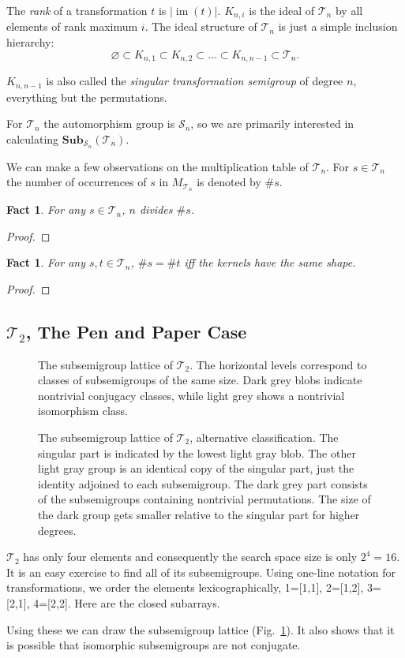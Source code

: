 \documentclass{amsart}
\newcommand{\cT}{{\mathcal T}}
\newcommand{\cS}{{\mathcal S}}
\newcommand{\Sub}{\mathbf{Sub}}
\DeclareMathOperator{\im}{im}
\theoremstyle{plain}
\newtheorem{fact}[theorem]{Fact}
\theoremstyle{definition}
\begin{document}
The \emph{rank} of a transformation $t$ is $|\im(t)|$. 
$K_{n,i}$ is the ideal of $\cT_n$ by all elements of rank maximum $i$.
The ideal structure of $\cT_n$ is just a simple inclusion hierarchy:
$$\varnothing\subset K_{n,1}\subset K_{n,2}\subset\ldots\subset K_{n,n-1}\subset \cT_n.$$

$K_{n,n-1}$ is also called the \emph{singular transformation semigroup} of degree $n$, everything but the permutations.

 For $\cT_n$ the automorphism group is $\cS_n$, so we are primarily interested in calculating $\Sub_{\cS_n}(\cT_n)$.

We can make a few observations on the multiplication table of $\cT_n$. For $s\in\cT_n$ the number of occurrences of $s$ in $M_{\cT_n}$ is denoted by $\#s$.
\begin{fact}
For any  $s\in\cT_n$,  $n$ divides $\#s$.
\end{fact}
\begin{proof}
\end{proof}

\begin{fact}
For any  $s,t\in\cT_n$,  $\#s=\#t$ iff the kernels have the same shape.
\end{fact}
\begin{proof}
\end{proof}

\subsection{$\cT_2$, The Pen and Paper Case}
\begin{figure}[t]

\caption{The subsemigroup lattice of $\cT_2$. The horizontal levels correspond to classes of subsemigroups of the same size.  Dark grey blobs indicate nontrivial conjugacy classes, while light grey shows a nontrivial isomorphism class.}
\label{fig:T2subs}
\end{figure}
\begin{figure}

\caption{The subsemigroup lattice of $\cT_2$, alternative classification. The singular part is indicated by the lowest light gray blob. The other light gray group is an identical copy of the singular part, just the identity adjoined to each subsemigroup. The dark grey part consists of the subsemigroups containing nontrivial permutations. The size of the dark group gets smaller relative to the singular part for higher degrees.}
\label{fig:T2subsAlt}
\end{figure}
$\cT_2$ has only four elements and consequently the search space size is only $2^4=16$.
It is an easy exercise to find all of its subsemigroups. 
Using one-line notation for transformations, we order the elements lexicographically, 1=[1,1], 2=[1,2], 3=[2,1], 4=[2,2]. Here are the closed subarrays.

Using these we can draw the subsemigroup lattice (Fig.\ \ref{fig:T2subs}).
It also shows that it is possible that isomorphic subsemigroups are not conjugate.
\end{document}
